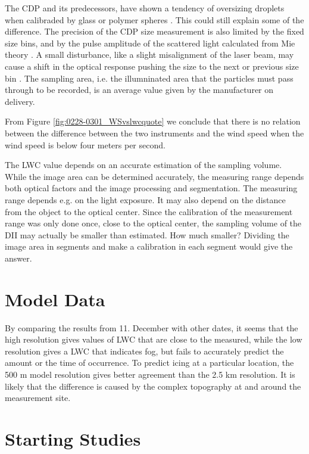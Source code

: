 The CDP and its predecessors, have shown a tendency of oversizing droplets when calibraded by glass or polymer spheres \cite{wend1996,lance2010}. This could still explain some of the difference. The precision of the CDP size measurement is also limited by the fixed size bins, and by the pulse amplitude of the scattered light calculated from Mie theory \cite{lance2010,bohr2008}. A small disturbance, like a slight misalignment of the laser beam, may cause a shift in the optical response pushing the size to the next or previous size bin \cite{lance2010}. The sampling area, i.e. the illumninated area that the particles must pass through to be recorded, is an average value given by the manufacturer on delivery. 

From Figure \ref{fig:0228-0301_WSvslwcquote} we conclude that there is no relation between the difference between the two instruments and the wind speed when the wind speed is below four meters per second.

The LWC value depends on an accurate estimation of the sampling volume. While the image area can be determined accurately, the measuring range depends both optical factors and the image processing and segmentation. The measuring range depends e.g. on the light exposure. It may also depend on the distance from the object to the optical center. Since the calibration of the measurement range was only done once, close to the optical center, the sampling volume of the DII may actually be smaller than estimated. How much smaller? Dividing the image area in segments and make a calibration in each segment would give the answer.

\section{Model Data}

By comparing the results from 11. December with other dates, it seems that the high resolution gives values of LWC that are close to the measured, while the low resolution gives a LWC that indicates fog, but fails to accurately predict the amount or the time of occurrence. To predict icing at a particular location, the 500 m model resolution gives better agreement than the 2.5 km resolution. It is likely that the difference is caused by the complex topography at and around the measurement site.

\section{Starting Studies}
\label{sec:discussionstarting}

